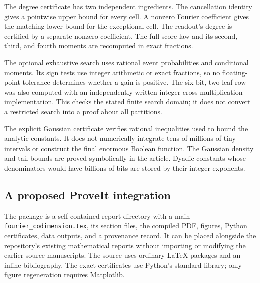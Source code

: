 The degree certificate has two independent ingredients. The
cancellation identity gives a pointwise upper bound for every cell.
A nonzero Fourier coefficient gives the matching lower bound for the
exceptional cell. The readout's degree is certified by a separate
nonzero coefficient. The full score law and its second, third, and
fourth moments are recomputed in exact fractions.

The optional exhaustive search uses rational event probabilities and
conditional moments. Its sign tests use integer arithmetic or exact
fractions, so no floating-point tolerance determines whether a gain
is positive. The six-bit, two-leaf row was also computed with an
independently written integer cross-multiplication implementation.
This checks the stated finite search domain; it does not convert a
restricted search into a proof about all partitions.

The explicit Gaussian certificate verifies rational inequalities used
to bound the analytic constants. It does not numerically integrate
tens of millions of tiny intervals or construct the final enormous
Boolean function. The Gaussian density and tail bounds are proved
symbolically in the article. Dyadic constants whose denominators would
have billions of bits are stored by their integer exponents.

\subsection{A proposed ProveIt integration}

The package is a self-contained report directory with a main
\texttt{fourier\_codimension.tex}, its section files, the compiled PDF,
figures, Python certificates, data outputs, and a provenance record.
It can be placed alongside the repository's existing mathematical
reports without importing or modifying the earlier source manuscripts.
The source uses ordinary \LaTeX{} packages and an inline bibliography.
The exact certificates use Python's standard library; only figure
regeneration requires Matplotlib.

